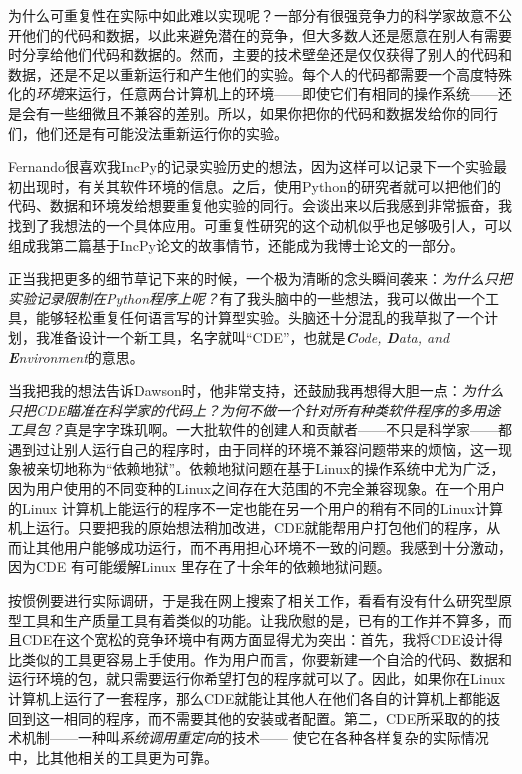 \documentclass[letter,12pt]{book}
\begin{document}
\begin{CJK}{UTF8}{gbsn}
为什么可重复性在实际中如此难以实现呢？一部分有很强竞争力的科学家故意不公开他们的代码和数据，以此来避免潜在的竞争，但大多数人还是愿意在别人有需要时分享给他们代码和数据的。然而，主要的技术壁垒还是仅仅获得了别人的代码和数据，还是不足以重新运行和产生他们的实验。每个人的代码都需要一个高度特殊化的\emph{环境}来运行，任意两台计算机上的环境——即使它们有相同的操作系统——还是会有一些细微且不兼容的差别。所以，如果你把你的代码和数据发给你的同行们，他们还是有可能没法重新运行你的实验。

Fernando很喜欢我IncPy的记录实验历史的想法，因为这样可以记录下一个实验最初出现时，有关其软件环境的信息。之后，使用Python的研究者就可以把他们的代码、数据和环境发给想要重复他实验的同行。会谈出来以后我感到非常振奋，我找到了我想法的一个具体应用。可重复性研究的这个动机似乎也足够吸引人，可以组成我第二篇基于IncPy论文的故事情节，还能成为我博士论文的一部分。

正当我把更多的细节草记下来的时候，一个极为清晰的念头瞬间袭来：\emph{为什么只把实验记录限制在Python程序上呢？}有了我头脑中的一些想法，我可以做出一个工具，能够轻松重复任何语言写的计算型实验。头脑还十分混乱的我草拟了一个计划，我准备设计一个新工具，名字就叫“CDE”，也就是\emph{\textbf{C}ode, \textbf{D}ata, and \textbf{E}nvironment}的意思。

\breakline

当我把我的想法告诉Dawson时，他非常支持，还鼓励我再想得大胆一点：\emph{为什么只把CDE瞄准在科学家的代码上？为何不做一个针对所有种类软件程序的多用途工具包？}真是字字珠玑啊。一大批软件的创建人和贡献者——不只是科学家——都遇到过让别人运行自己的程序时，由于同样的环境不兼容问题带来的烦恼，这一现象被亲切地称为“依赖地狱”。依赖地狱问题在基于Linux的操作系统中尤为广泛，因为用户使用的不同变种的Linux之间存在大范围的不完全兼容现象。在一个用户的Linux 计算机上能运行的程序不一定也能在另一个用户的稍有不同的Linux计算机上运行。只要把我的原始想法稍加改进，CDE就能帮用户打包他们的程序，从而让其他用户能够成功运行，而不再用担心环境不一致的问题。我感到十分激动，因为CDE 有可能缓解Linux 里存在了十余年的依赖地狱问题。

按惯例要进行实际调研，于是我在网上搜索了相关工作，看看有没有什么研究型原型工具和生产质量工具有着类似的功能。让我欣慰的是，已有的工作并不算多，而且CDE在这个宽松的竞争环境中有两方面显得尤为突出：首先，我将CDE设计得比类似的工具更容易上手使用。作为用户而言，你要新建一个自洽的代码、数据和运行环境的包，就只需要运行你希望打包的程序就可以了。因此，如果你在Linux计算机上运行了一套程序，那么CDE就能让其他人在他们各自的计算机上都能返回到这一相同的程序，而不需要其他的安装或者配置。第二，CDE所采取的的技术机制——一种叫\emph{系统调用重定向}的技术—— 使它在各种各样复杂的实际情况中，比其他相关的工具更为可靠。


\end{CJK}
\end{document}
